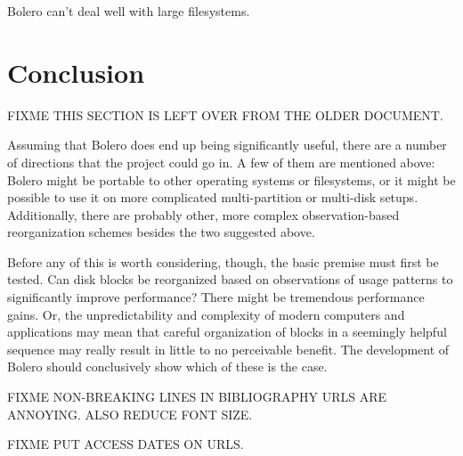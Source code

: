\documentclass[10pt,twocolumn,letterpaper]{article}
\begin{document}
Bolero can't deal well with large filesystems.

\section{Conclusion}

FIXME THIS SECTION IS LEFT OVER FROM THE OLDER DOCUMENT.

Assuming that Bolero does end up being significantly useful, there are a number of directions that
the project could go in. A few of them are mentioned above: Bolero might be portable to other
operating systems or filesystems, or it might be possible to use it on more complicated multi-partition
or multi-disk setups. Additionally, there are probably other, more complex observation-based reorganization schemes
besides the two suggested above.

Before any of this is worth considering, though, the basic premise must first be tested. Can disk
blocks be reorganized based on observations of usage patterns to significantly improve performance?
There might be tremendous performance gains. Or, the unpredictability and complexity of modern
computers and applications may mean that careful organization of blocks in a seemingly helpful
sequence may really result in little to no perceivable benefit. The development of Bolero should conclusively
show which of these is the case.

FIXME NON-BREAKING LINES IN BIBLIOGRAPHY URLS ARE ANNOYING. ALSO REDUCE FONT SIZE.

FIXME PUT ACCESS DATES ON URLS.

{}

\end{document}
